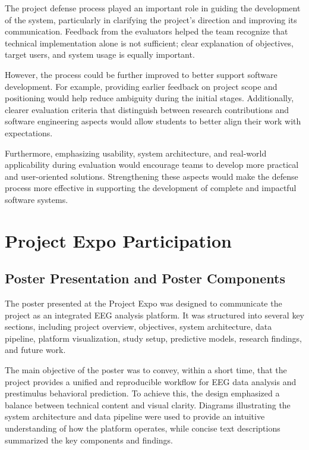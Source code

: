 The project defense process played an important role in guiding the development of the system, particularly in clarifying the project's direction and improving its communication. Feedback from the evaluators helped the team recognize that technical implementation alone is not sufficient; clear explanation of objectives, target users, and system usage is equally important.

However, the process could be further improved to better support software development. For example, providing earlier feedback on project scope and positioning would help reduce ambiguity during the initial stages. Additionally, clearer evaluation criteria that distinguish between research contributions and software engineering aspects would allow students to better align their work with expectations.

Furthermore, emphasizing usability, system architecture, and real-world applicability during evaluation would encourage teams to develop more practical and user-oriented solutions. Strengthening these aspects would make the defense process more effective in supporting the development of complete and impactful software systems.

\section{Project Expo Participation}
\label{sec:expo-participation}

\subsection{Poster Presentation and Poster Components}
\label{subsec:expo-poster}

The poster presented at the Project Expo was designed to communicate the project as an integrated EEG analysis platform. It was structured into several key sections, including project overview, objectives, system architecture, data pipeline, platform visualization, study setup, predictive models, research findings, and future work.

The main objective of the poster was to convey, within a short time, that the project provides a unified and reproducible workflow for EEG data analysis and prestimulus behavioral prediction. To achieve this, the design emphasized a balance between technical content and visual clarity. Diagrams illustrating the system architecture and data pipeline were used to provide an intuitive understanding of how the platform operates, while concise text descriptions summarized the key components and findings.

